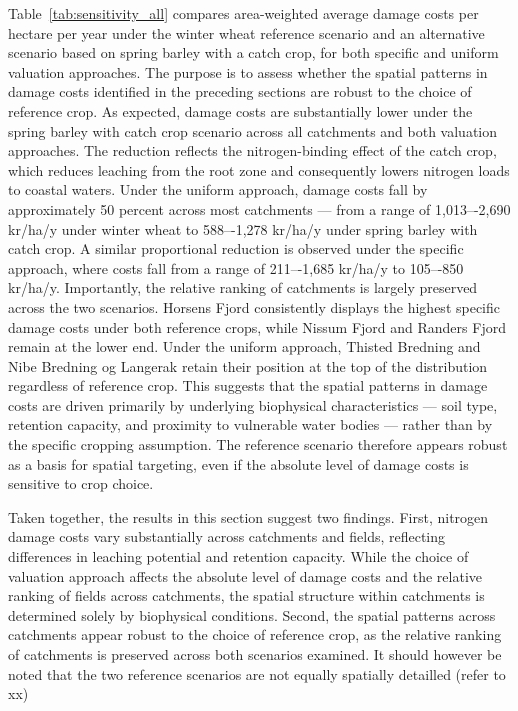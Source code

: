\documentclass[12pt]{article}
\begin{document}
Table~\ref{tab:sensitivity_all} compares area-weighted average damage costs per hectare per year under the winter wheat reference scenario and an alternative scenario based on spring barley with a catch crop, for both specific and uniform valuation approaches. The purpose is to assess whether the spatial patterns in damage costs identified in the preceding sections are robust to the choice of reference crop.
As expected, damage costs are substantially lower under the spring barley with catch crop scenario across all catchments and both valuation approaches. The reduction reflects the nitrogen-binding effect of the catch crop, which reduces leaching from the root zone and consequently lowers nitrogen loads to coastal waters. Under the uniform approach, damage costs fall by approximately 50 percent across most catchments — from a range of 1,013–-2,690 kr/ha/y under winter wheat to 588–-1,278 kr/ha/y under spring barley with catch crop. A similar proportional reduction is observed under the specific approach, where costs fall from a range of 211–-1,685 kr/ha/y to 105–-850 kr/ha/y.
Importantly, the relative ranking of catchments is largely preserved across the two scenarios. Horsens Fjord consistently displays the highest specific damage costs under both reference crops, while Nissum Fjord and Randers Fjord remain at the lower end. Under the uniform approach, Thisted Bredning and Nibe Bredning og Langerak retain their position at the top of the distribution regardless of reference crop. This suggests that the spatial patterns in damage costs are driven primarily by underlying biophysical characteristics — soil type, retention capacity, and proximity to vulnerable water bodies — rather than by the specific cropping assumption. The reference scenario therefore appears robust as a basis for spatial targeting, even if the absolute level of damage costs is sensitive to crop choice.

Taken together, the results in this section suggest two findings. First, nitrogen damage costs vary substantially across catchments and fields, reflecting differences in leaching potential and retention capacity. While the choice of valuation approach affects the absolute level of damage costs and the relative ranking of fields across catchments, the spatial structure within catchments is determined solely by biophysical conditions. Second, the spatial patterns across catchments appear robust to the choice of reference crop, as the relative ranking of catchments is preserved across both scenarios examined. It should however be noted that the two reference scenarios are not equally spatially detailled (refer to xx)
\end{document}
